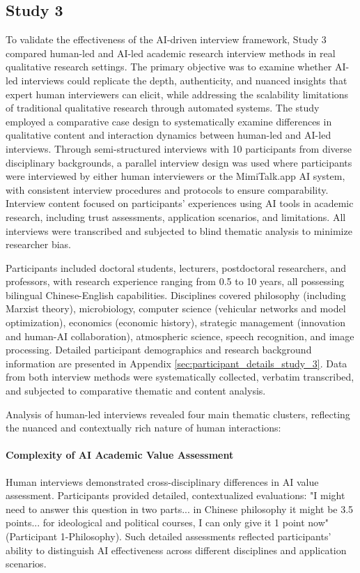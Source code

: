 \documentclass[sigchi,nonacm,manuscript]{acmart}
\begin{document}
\subsection{Study 3}
To validate the effectiveness of the AI-driven interview framework, Study 3 compared human-led and AI-led academic research interview methods in real qualitative research settings. The primary objective was to examine whether AI-led interviews could replicate the depth, authenticity, and nuanced insights that expert human interviewers can elicit, while addressing the scalability limitations of traditional qualitative research through automated systems. The study employed a comparative case design to systematically examine differences in qualitative content and interaction dynamics between human-led and AI-led interviews. Through semi-structured interviews with 10 participants from diverse disciplinary backgrounds, a parallel interview design was used where participants were interviewed by either human interviewers or the MimiTalk.app AI system, with consistent interview procedures and protocols to ensure comparability. Interview content focused on participants' experiences using AI tools in academic research, including trust assessments, application scenarios, and limitations. All interviews were transcribed and subjected to blind thematic analysis to minimize researcher bias.

Participants included doctoral students, lecturers, postdoctoral researchers, and professors, with research experience ranging from 0.5 to 10 years, all possessing bilingual Chinese-English capabilities. Disciplines covered philosophy (including Marxist theory), microbiology, computer science (vehicular networks and model optimization), economics (economic history), strategic management (innovation and human-AI collaboration), atmospheric science, speech recognition, and image processing. Detailed participant demographics and research background information are presented in Appendix \ref{sec:participant_details_study_3}. Data from both interview methods were systematically collected, verbatim transcribed, and subjected to comparative thematic and content analysis.

Analysis of human-led interviews revealed four main thematic clusters, reflecting the nuanced and contextually rich nature of human interactions:

\paragraph{Complexity of AI Academic Value Assessment} Human interviews demonstrated cross-disciplinary differences in AI value assessment. Participants provided detailed, contextualized evaluations: "I might need to answer this question in two parts... in Chinese philosophy it might be 3.5 points... for ideological and political courses, I can only give it 1 point now" (Participant 1-Philosophy). Such detailed assessments reflected participants' ability to distinguish AI effectiveness across different disciplines and application scenarios.
\end{document}
